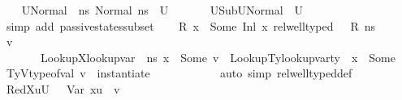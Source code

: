 \begin{isabellebody}
\ \ \isamarkupfalse%
\ {\isacharquery}{\kern0pt}U{}Normal\ {\isacharequal}{\kern0pt}\ {\isachardoublequoteopen}{\isacharbraceleft}{\kern0pt}ns{\isachardot}{\kern0pt}\ Normal\ ns\ {\isasymin}\ {\isacharquery}{\kern0pt}U{}{\isacharbraceright}{\kern0pt}{\isachardoublequoteclose}\ \ \ \isanewline
\ \ \isamarkupfalse%
\ U{}Sub{\isacharcolon}{\kern0pt}{\isachardoublequoteopen}{\isacharquery}{\kern0pt}U{}Normal\ {\isasymsubseteq}\ U{}{\isachardoublequoteclose}\isanewline
\ \ \ \ \isamarkupfalse%
\ {\isacharparenleft}{\kern0pt}simp\ add{\isacharcolon}{\kern0pt}\ passive{\isacharunderscore}{\kern0pt}states{\isacharunderscore}{\kern0pt}subset{\isacharparenright}{\kern0pt}\isanewline
\ \ \isamarkupfalse%
\ {\isacartoucheopen}R\ x\ {\isacharequal}{\kern0pt}\ Some\ {\isacharparenleft}{\kern0pt}Inl\ x{}{\isacharparenright}{\kern0pt}{\isacartoucheclose}\ {\isacartoucheopen}rel{\isacharunderscore}{\kern0pt}well{\isacharunderscore}{\kern0pt}typed\ {\isasymLambda}\ {\isasymOmega}\ R\ ns{\isacartoucheclose}\ \isamarkupfalse%
\ v\ {\isasymtau}\ \ \isanewline
\ \ \ \ \ \ \ LookupX{\isacharcolon}{\kern0pt}{\isachardoublequoteopen}lookup{\isacharunderscore}{\kern0pt}var\ {\isasymLambda}\ ns\ x\ {\isacharequal}{\kern0pt}\ Some\ v{\isachardoublequoteclose}\ \ LookupTy{\isacharcolon}{\kern0pt}{\isachardoublequoteopen}lookup{\isacharunderscore}{\kern0pt}var{\isacharunderscore}{\kern0pt}ty\ {\isasymLambda}\ x\ {\isacharequal}{\kern0pt}\ Some\ {\isasymtau}{\isachardoublequoteclose}\ \ TyV{\isacharcolon}{\kern0pt}{\isachardoublequoteopen}type{\isacharunderscore}{\kern0pt}of{\isacharunderscore}{\kern0pt}val\ v\ {\isacharequal}{\kern0pt}\ instantiate\ {\isasymOmega}\ {\isasymtau}{\isachardoublequoteclose}\ \isanewline
\ \ \ \ \ \ \ \isamarkupfalse%
\ {\isacharparenleft}{\kern0pt}auto\ simp{\isacharcolon}{\kern0pt}\ rel{\isacharunderscore}{\kern0pt}well{\isacharunderscore}{\kern0pt}typed{\isacharunderscore}{\kern0pt}def{\isacharparenright}{\kern0pt}\isanewline
\ \ \isamarkupfalse%
\ RedX{}{\isacharcolon}{\kern0pt}{\isachardoublequoteopen}{\isasymforall}u{\isasymin}U{}{\isachardot}{\kern0pt}\ {\isasymLambda}{\isacharprime}{\kern0pt}{\isacharcomma}{\kern0pt}{\isasymGamma}{\isacharcomma}{\kern0pt}{\isasymOmega}\ {\isasymturnstile}\ {\isasymlangle}Var\ x{}{\isacharcomma}{\kern0pt}u{\isasymrangle}\ {\isasymDown}\ v{\isachardoublequoteclose}\ \ \ \ \ \ \ \ \isanewline

\end{isabellebody}
